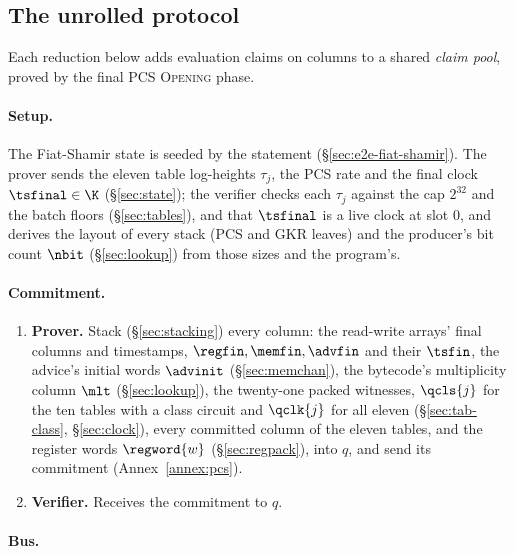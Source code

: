 \subsection{The unrolled protocol}\label{sec:e2e-unrolled}

Each reduction below adds evaluation claims on columns to a shared \emph{claim pool}, proved by the final PCS \textsc{Opening} phase.

\paragraph{Setup.}

The Fiat-Shamir state is seeded by the statement (\S\ref{sec:e2e-fiat-shamir}). The prover sends the eleven table log-heights $\tau_j$, the PCS rate and the final clock $\tsfinal\in\K$ (\S\ref{sec:state}); the verifier checks each $\tau_j$ against the cap $2^{32}$ and the batch floors (\S\ref{sec:tables}), and that $\tsfinal$ is a live clock at slot $0$, and derives the layout of every stack (PCS and GKR leaves) and the producer's bit count $\nbit$ (\S\ref{sec:lookup}) from those sizes and the program's.

\paragraph{Commitment.}

\begin{enumerate}
\item \textbf{Prover.} Stack (\S\ref{sec:stacking}) every column: the read-write arrays' final columns and timestamps, $\regfin,\memfin,\advfin$ and their $\tsfin$, the advice's initial words $\advinit$ (\S\ref{sec:memchan}), the bytecode's multiplicity column $\mlt$ (\S\ref{sec:lookup}), the twenty-one packed witnesses, $\qcls{j}$ for the ten tables with a class circuit and $\qclk{j}$ for all eleven (\S\ref{sec:tab-class}, \S\ref{sec:clock}), every committed column of the eleven tables, and the register words $\regword{w}$ (\S\ref{sec:regpack}), into $q$, and send its commitment (Annex~\ref{annex:pcs}).
\item \textbf{Verifier.} Receives the commitment to $q$.
\end{enumerate}

\paragraph{Bus.}

